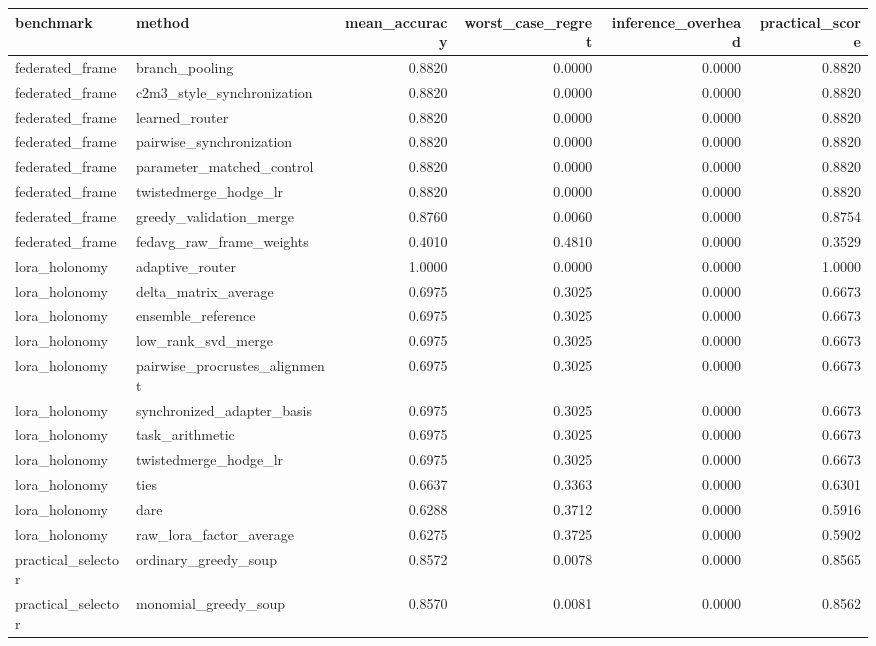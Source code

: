 \begin{tabular}{llrrrr}
\toprule
benchmark & method & mean_accuracy & worst_case_regret & inference_overhead & practical_score \\
\midrule
federated_frame & branch_pooling & 0.8820 & 0.0000 & 0.0000 & 0.8820 \\
federated_frame & c2m3_style_synchronization & 0.8820 & 0.0000 & 0.0000 & 0.8820 \\
federated_frame & learned_router & 0.8820 & 0.0000 & 0.0000 & 0.8820 \\
federated_frame & pairwise_synchronization & 0.8820 & 0.0000 & 0.0000 & 0.8820 \\
federated_frame & parameter_matched_control & 0.8820 & 0.0000 & 0.0000 & 0.8820 \\
federated_frame & twistedmerge_hodge_lr & 0.8820 & 0.0000 & 0.0000 & 0.8820 \\
federated_frame & greedy_validation_merge & 0.8760 & 0.0060 & 0.0000 & 0.8754 \\
federated_frame & fedavg_raw_frame_weights & 0.4010 & 0.4810 & 0.0000 & 0.3529 \\
lora_holonomy & adaptive_router & 1.0000 & 0.0000 & 0.0000 & 1.0000 \\
lora_holonomy & delta_matrix_average & 0.6975 & 0.3025 & 0.0000 & 0.6673 \\
lora_holonomy & ensemble_reference & 0.6975 & 0.3025 & 0.0000 & 0.6673 \\
lora_holonomy & low_rank_svd_merge & 0.6975 & 0.3025 & 0.0000 & 0.6673 \\
lora_holonomy & pairwise_procrustes_alignment & 0.6975 & 0.3025 & 0.0000 & 0.6673 \\
lora_holonomy & synchronized_adapter_basis & 0.6975 & 0.3025 & 0.0000 & 0.6673 \\
lora_holonomy & task_arithmetic & 0.6975 & 0.3025 & 0.0000 & 0.6673 \\
lora_holonomy & twistedmerge_hodge_lr & 0.6975 & 0.3025 & 0.0000 & 0.6673 \\
lora_holonomy & ties & 0.6637 & 0.3363 & 0.0000 & 0.6301 \\
lora_holonomy & dare & 0.6288 & 0.3712 & 0.0000 & 0.5916 \\
lora_holonomy & raw_lora_factor_average & 0.6275 & 0.3725 & 0.0000 & 0.5902 \\
practical_selector & ordinary_greedy_soup & 0.8572 & 0.0078 & 0.0000 & 0.8565 \\
practical_selector & monomial_greedy_soup & 0.8570 & 0.0081 & 0.0000 & 0.8562 \\

\end{tabular}
